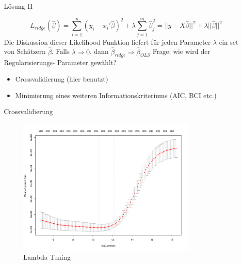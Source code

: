 \documentclass[10pt]{beamer}
\begin{document}
\begin{frame}{Lösung II}

    \begin{equation*}
        L_{ridge}(\hat{\beta})=\sum_{i=1}^{n}(y_{i}-x_{i}'\hat{\beta})^2+\lambda\sum_{j=1}^{m}\hat{\beta}_{j}^2=||y-X\hat{\beta}||^2+\lambda||\hat{\beta}||^2
    \end{equation*}
    Die Diskussion dieser Likelihood Funktion liefert für jeden Parameter $\lambda$ ein set von Schätzern $\hat{\beta}$.
    Falls $\lambda \Rightarrow 0$, dann $\hat{\beta}_{ridge} \Rightarrow \hat{\beta}_{OLS}$
    Frage: wie wird der Regularisierungs- Parameter gewählt?
    \begin{itemize}
        \item Crossvalidierung (hier benutzt)
        \item Minimierung eines weiteren Informationskriteriums (AIC, BCI etc.)
    \end{itemize}
    
\end{frame}

\begin{frame}{Crossvalidierung}

    \begin{figure}
        \centering
        \includegraphics[width=0.8\textwidth, keepaspectratio]{figures/ridge_tuning.pdf}
        \caption{Lambda Tuning}
    \end{figure}
    
\end{frame}
\end{document}
